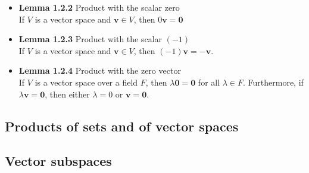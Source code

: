 \documentclass[11pt,a4paper]{article}
\begin{document}
\begin{itemize}
    \item \textbf{Lemma 1.2.2} Product with the scalar zero \\
        If $V$ is a vector space and $\mathbf{v} \in V$, then $0\mathbf{v} = \mathbf{0}$

    \item \textbf{Lemma 1.2.3} Product with the scalar $(-1)$ \\
        If $V$ is a vector space and $\mathbf{v} \in V$, then $(-1)\mathbf{v} = -\mathbf{v}$.

    \item \textbf{Lemma 1.2.4} Product with the zero vector \\
        If $V$ is a vector space over a field $F$, then $\lambda\mathbf{0} = \mathbf{0}$
        for all $\lambda \in F$.
        Furthermore, if $\lambda \mathbf{v} = \mathbf{0}$,
        then either $\lambda = 0$ or $\mathbf{v} = \mathbf{0}$.

\end{itemize}

\subsection{Products of sets and of vector spaces}

\subsection{Vector subspaces}
\end{document}
